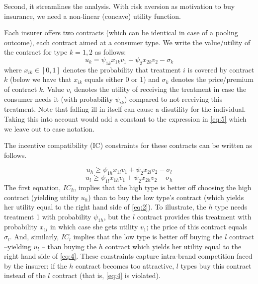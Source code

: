 \documentclass[a4paper,12pt]{article}
\begin{document}
Second, it streamlines the analysis. With risk aversion as motivation to buy insurance, we need a non-linear (concave) utility function. 

Each insurer offers two contracts (which can be identical in case of a pooling outcome), each contract aimed at a consumer type. We write the value/utility of the contract for type \(k=1,2\) as follows:
\begin{equation}
\label{eq:5}
u_{k} = \psi_{1k} x_{1k} v_1 + \psi_{2} x_{2k} v_2 - \sigma_k
\end{equation}
where \(x_{ik} \in [0,1]\) denotes the probability that treatment \(i\) is covered by contract \(k\) (below we have that \(x_{ik}\) equals either 0 or 1) and \(\sigma_k\) denotes the price/premium of contract \(k\). Value \(v_i\) denotes the utility of receiving the treatment in case the consumer needs it (with probability \(\psi_{ik}\)) compared to not receiving this treatment. Note that falling ill in itself can cause a disutility for the individual. Taking this into account would add a constant to the expression in \eqref{eq:5} which we leave out to ease notation.

The incentive compatibility (IC) constraints for these contracts can be written as follows.

\begin{equation}
\label{eq:2}
u_h \geq  \psi_{1h} x_{1l} v_1 + \psi_{2} x_{2l} v_2 - \sigma_{l}
\end{equation}
\begin{equation}
\label{eq:4}
u_l \geq  \psi_{1l} x_{1h} v_1 + \psi_{2} x_{2h} v_2 - \sigma_h
\end{equation}
The first equation, \(IC_h\), implies that the high type is better off choosing the high contract (yielding utility \(u_h\)) than to buy the low type's contract (which yields her utility equal to the right hand side of \eqref{eq:2}). To illustrate, the \(h\) type needs treatment 1 with probability \(\psi_{1h}\), but the \(l\) contract provides this treatment with probability \(x_{1l}\) in which case she gets utility \(v_{1}\); the price of this contract equals \(\sigma_{l}\). And, similarly, \(IC_l\) implies that the low type is better off buying the \(l\) contract --yielding \(u_l\) -- than buying the \(h\) contract which yields her utility equal to the right hand side of \eqref{eq:4}. These constraints capture intra-brand competition faced by the insurer: if the \(h\) contract becomes too attractive, \(l\) types buy this contract instead of the \(l\) contract (that is, \eqref{eq:4} is violated).
\end{document}
